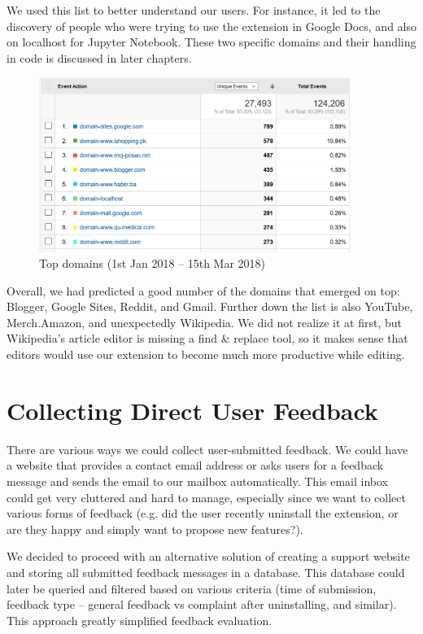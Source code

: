 \documentclass[bsc,frontabs,twoside,singlespacing,parskip,deptreport]{infthesis}
\begin{document}
We used this list to better understand our users. For instance, it led to the discovery of people who were trying to use the extension in Google Docs, and also on localhost for Jupyter Notebook. These two specific domains and their handling in code is discussed in later chapters.

\begin{figure}[h]
\centering
\includegraphics[width=0.9\textwidth]{../docs/top-domains.png}
\caption{Top domains (1st Jan 2018 -- 15th Mar 2018)}
\end{figure}

Overall, we had predicted a good number of the domains that emerged on top: Blogger, Google Sites, Reddit, and Gmail. Further down the list is also YouTube, Merch.Amazon, and unexpectedly Wikipedia. We did not realize it at first, but Wikipedia's article editor is missing a find \& replace tool, so it makes sense that editors would use our extension to become much more productive while editing.

\section{Collecting Direct User Feedback}
There are various ways we could collect user-submitted feedback. We could have a website that provides a contact email address or asks users for a feedback message and sends the email to our mailbox automatically. This email inbox could get very cluttered and hard to manage, especially since we want to collect various forms of feedback (e.g. did the user recently uninstall the extension, or are they happy and simply want to propose new features?). 

We decided to proceed with an alternative solution of creating a support website and storing all submitted feedback messages in a database. This database could later be queried and filtered based on various criteria (time of submission, feedback type -- general feedback vs complaint after uninstalling, and similar). This approach greatly simplified feedback evaluation.
\end{document}
